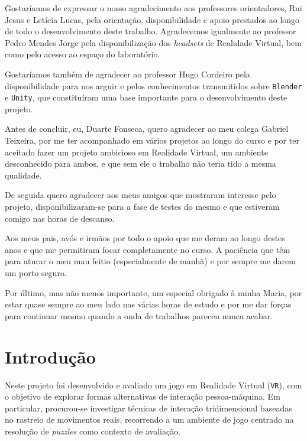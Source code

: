 \documentclass[a4paper, 12pt]{book}
\begin{document}
Gostaríamos de expressar o nosso agradecimento aos professores orientadores, Rui
Jesus e Letícia Lucas, pela orientação, disponibilidade e apoio prestados ao
longo de todo o desenvolvimento deste trabalho. Agradecemos igualmente ao
professor Pedro Mendes Jorge pela disponibilização dos \textit{headsets} de 
Realidade Virtual, bem como pelo acesso ao espaço do laboratório.
\par
Gostaríamos também de agradecer ao professor Hugo Cordeiro pela disponibilidade
para nos arguir e pelos conhecimentos transmitidos sobre \texttt{Blender} e
\texttt{Unity}, que constituíram uma base importante para o desenvolvimento
deste projeto.
\par
Antes de concluir, eu, Duarte Fonseca, quero agradecer ao meu colega Gabriel Teixeira, 
por me ter acompanhado em vários projetos ao longo do curso e por ter aceitado fazer 
um projeto ambicioso em Realidade Virtual, um ambiente desconhecido para ambos, e que 
sem ele o trabalho não teria tido a mesma qualidade. 
\par
De seguida quero agradecer aos meus amigos que mostraram interesse pelo projeto, disponibilizaram-se 
para a fase de testes do mesmo e que estiveram comigo nas horas de descanso. 
\par
Aos meus pais, avós e irmãos por todo o apoio que me deram ao longo destes anos e que me 
permitiram focar completamente no curso. A paciência que têm para aturar o meu mau feitio 
(especialmente de manhã) e por sempre me darem um porto seguro. 
\par
Por último, mas não menos importante, um especial obrigado à minha Maria, por estar quase 
sempre ao meu lado nas várias horas de estudo e por me dar forças para continuar mesmo quando 
a onda de trabalhos pareceu nunca acabar.


\myTableOfContents

\myListOfFigures

\myListOfTables


\mainmatter
\myPageStyle

\chapter{Introdução}
\label{ch:introducao}
Neste projeto foi desenvolvido e avaliado um jogo em Realidade Virtual (\texttt{VR}), com o objetivo de explorar 
formas alternativas de interação pessoa-máquina. Em particular, procurou-se investigar técnicas de 
interação tridimensional baseadas no rastreio de movimentos reais, recorrendo a um ambiente de jogo 
centrado na resolução de \textit{puzzles} como contexto de avaliação.
\end{document}

